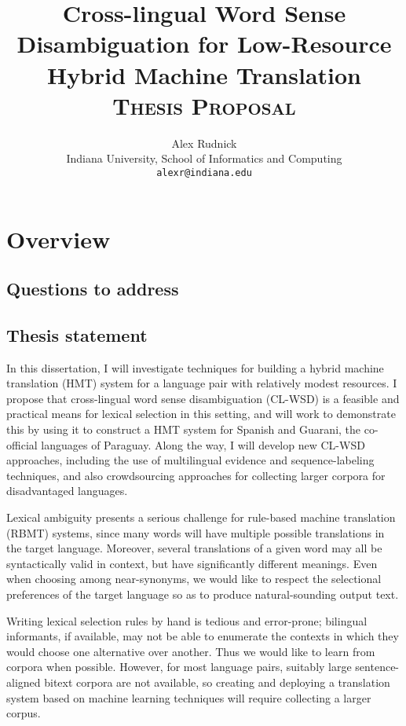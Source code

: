\documentclass{article}
\title{Cross-lingual Word Sense Disambiguation for Low-Resource Hybrid Machine
Translation
  \\ \vspace{2 mm}
  {\Large \textsc{Thesis Proposal}}
}
\author{Alex Rudnick \\
	    Indiana University, School of Informatics and Computing \\
	    {\tt alexr@indiana.edu}}
\date{}
\begin{document}
\maketitle

\section{Overview}

\subsection{Questions to address}

\subsection{Thesis statement}


In this dissertation, I will investigate techniques for building a hybrid
machine translation (HMT) system for a language pair with relatively modest
resources.
I propose that cross-lingual word sense disambiguation (CL-WSD) is a feasible
and practical means for lexical selection in this setting, and will work to
demonstrate this by using it to construct a HMT system for Spanish and Guarani,
the co-official languages of Paraguay.
Along the way, I will develop new CL-WSD approaches, including the use of
multilingual evidence and sequence-labeling techniques, and also crowdsourcing
approaches for collecting larger corpora for disadvantaged languages.

Lexical ambiguity presents a serious challenge for rule-based machine
translation (RBMT) systems, since many words will have multiple possible
translations in the target language. Moreover, several translations of a given
word may all be syntactically valid in context, but have significantly
different meanings. Even when choosing among near-synonyms, we would like to
respect the selectional preferences of the target language so as to produce
natural-sounding output text.

Writing lexical selection rules by hand is tedious and error-prone; bilingual
informants, if available, may not be able to enumerate the contexts in which
they would choose one alternative over another. Thus we would like to learn
from corpora when possible. However, for most language pairs, suitably large
sentence-aligned bitext corpora are not available, so creating and deploying a
translation system based on machine learning techniques will require collecting
a larger corpus.
\end{document}
